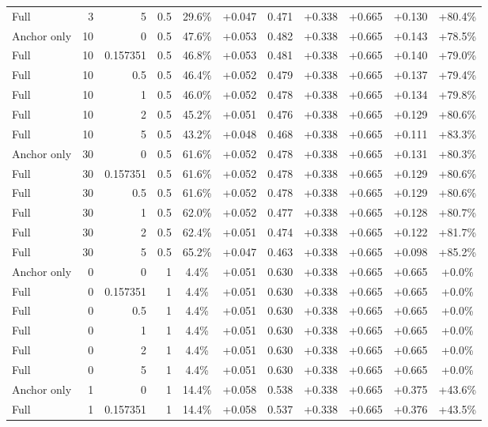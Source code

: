 \begin{table}[htbp]
\begin{tabular}{lrrrccccccc}
Full & 3 & 5 & 0.5 & 29.6\% & +0.047 & 0.471 & +0.338 & +0.665 & +0.130 & +80.4\% \\
Anchor only & 10 & 0 & 0.5 & 47.6\% & +0.053 & 0.482 & +0.338 & +0.665 & +0.143 & +78.5\% \\
Full & 10 & 0.157351 & 0.5 & 46.8\% & +0.053 & 0.481 & +0.338 & +0.665 & +0.140 & +79.0\% \\
Full & 10 & 0.5 & 0.5 & 46.4\% & +0.052 & 0.479 & +0.338 & +0.665 & +0.137 & +79.4\% \\
Full & 10 & 1 & 0.5 & 46.0\% & +0.052 & 0.478 & +0.338 & +0.665 & +0.134 & +79.8\% \\
Full & 10 & 2 & 0.5 & 45.2\% & +0.051 & 0.476 & +0.338 & +0.665 & +0.129 & +80.6\% \\
Full & 10 & 5 & 0.5 & 43.2\% & +0.048 & 0.468 & +0.338 & +0.665 & +0.111 & +83.3\% \\
Anchor only & 30 & 0 & 0.5 & 61.6\% & +0.052 & 0.478 & +0.338 & +0.665 & +0.131 & +80.3\% \\
Full & 30 & 0.157351 & 0.5 & 61.6\% & +0.052 & 0.478 & +0.338 & +0.665 & +0.129 & +80.6\% \\
Full & 30 & 0.5 & 0.5 & 61.6\% & +0.052 & 0.478 & +0.338 & +0.665 & +0.129 & +80.6\% \\
Full & 30 & 1 & 0.5 & 62.0\% & +0.052 & 0.477 & +0.338 & +0.665 & +0.128 & +80.7\% \\
Full & 30 & 2 & 0.5 & 62.4\% & +0.051 & 0.474 & +0.338 & +0.665 & +0.122 & +81.7\% \\
Full & 30 & 5 & 0.5 & 65.2\% & +0.047 & 0.463 & +0.338 & +0.665 & +0.098 & +85.2\% \\
Anchor only & 0 & 0 & 1 & 4.4\% & +0.051 & 0.630 & +0.338 & +0.665 & +0.665 & +0.0\% \\
Full & 0 & 0.157351 & 1 & 4.4\% & +0.051 & 0.630 & +0.338 & +0.665 & +0.665 & +0.0\% \\
Full & 0 & 0.5 & 1 & 4.4\% & +0.051 & 0.630 & +0.338 & +0.665 & +0.665 & +0.0\% \\
Full & 0 & 1 & 1 & 4.4\% & +0.051 & 0.630 & +0.338 & +0.665 & +0.665 & +0.0\% \\
Full & 0 & 2 & 1 & 4.4\% & +0.051 & 0.630 & +0.338 & +0.665 & +0.665 & +0.0\% \\
Full & 0 & 5 & 1 & 4.4\% & +0.051 & 0.630 & +0.338 & +0.665 & +0.665 & +0.0\% \\
Anchor only & 1 & 0 & 1 & 14.4\% & +0.058 & 0.538 & +0.338 & +0.665 & +0.375 & +43.6\% \\
Full & 1 & 0.157351 & 1 & 14.4\% & +0.058 & 0.537 & +0.338 & +0.665 & +0.376 & +43.5\% \\

\end{tabular}
\end{table}
